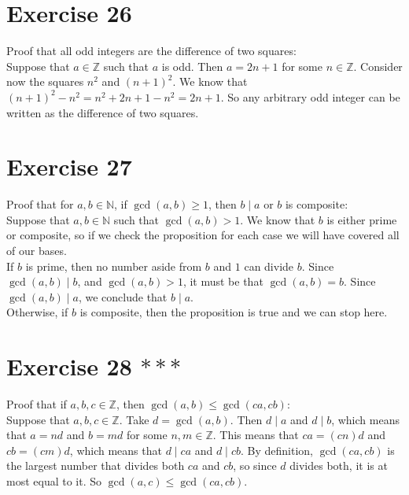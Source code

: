 \documentclass[12pt]{article}
\newcommand{\N}{\mathbb{N}}
\newcommand{\Z}{\mathbb{Z}}
\begin{document}
    \section*{Exercise 26}
    Proof that all odd integers are the difference of two squares: \\
    Suppose that $a \in \Z$
    such that $a$ is odd.
    Then $a = 2n+1$ for some $n \in \Z$.
    Consider now the squares $n^2$ and $(n+1)^2$.
    We know that $(n+1)^2 - n^2 = n^2 + 2n + 1 - n^2 = 2n+1$.
    So any arbitrary odd integer can be written
    as the difference of two squares. \\

    \section*{Exercise 27}
    Proof that for $a, b \in \N$,
    if $\gcd(a, b) \geqslant 1$,
    then $b \mid a$ or $b$ is composite: \\
    Suppose that $a, b \in \N$
    such that $\gcd(a, b) > 1$.
    We know that $b$ is either prime or composite,
    so if we check the proposition for each case
    we will have covered all of our bases. \\
    If $b$ is prime,
    then no number aside from $b$ and $1$ can divide $b$.
    Since $\gcd(a, b) \mid b$,
    and $\gcd(a, b) > 1$,
    it must be that $\gcd(a, b) = b$.
    Since $\gcd(a, b) \mid a$,
    we conclude that $b \mid a$. \\
    Otherwise, if $b$ is composite,
    then the proposition is true and we can stop here. \\

    \section*{Exercise 28 $***$}
    Proof that if $a, b, c \in \Z$,
    then $\gcd(a, b) \leqslant \gcd(ca, cb)$: \\
    Suppose that $a, b, c \in \Z$.
    Take $d = \gcd(a, b)$.
    Then $d \mid a$ and $d \mid b$,
    which means that $a = nd$ and $b = md$
    for some $n, m \in \Z$.
    This means that $ca = (cn)d$ and $cb = (cm)d$,
    which means that $d \mid ca$ and $d \mid cb$.
    By definition,
    $\gcd(ca, cb)$
    is the largest number that divides both $ca$ and $cb$,
    so since $d$ divides both,
    it is at most equal to it.
    So $\gcd(a, c) \leqslant \gcd(ca, cb)$. \\
\end{document}
